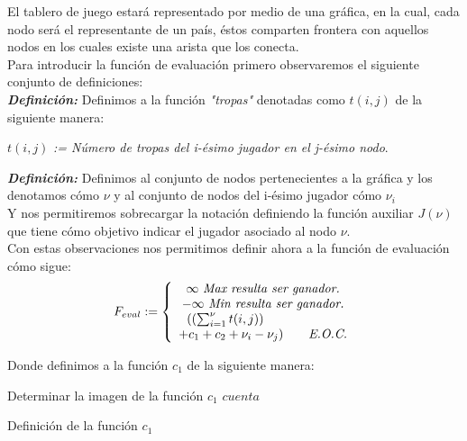 \documentclass[12pt,twocolumn,draft]{article}
\begin{document}
El tablero de juego estar\'a representado por medio de una gr\'afica, en la cual, cada nodo  ser\'a el representante de un pa\'is, \'estos comparten frontera con aquellos nodos en los cuales existe una arista que los conecta.\\

Para introducir la funci\'on de evaluaci\'on primero observaremos el siguiente conjunto de definiciones:\\

\textbf{\textit{Definici\'on:}}
Definimos a la funci\'on  \textit{"tropas"} denotadas como 
$t(i,j)$ de la siguiente manera:
\begin{center}
$t(i,j)$ \textit{:= N\'umero de tropas del i-\'esimo  jugador en el j-\'esimo nodo}.\\
\end{center}

\textbf{\textit{Definici\'on:}}
Definimos al conjunto de nodos pertenecientes a la gr\'afica y los denotamos c\'omo $\nu$ y al conjunto de nodos del i-\'esimo jugador c\'omo $\nu_{i}$\\

Y nos permitiremos sobrecargar la notaci\'on definiendo la funci\'on auxiliar $J(\nu)$ que tiene c\'omo objetivo indicar el jugador asociado al nodo $\nu$.\\


Con estas observaciones nos permitimos definir ahora a la funci\'on de evaluaci\'on c\'omo sigue:\\

$$ 
F_{eval}:= \left\{\begin{array}{c l}
  \infty\ \textit{Max\ resulta\ ser\ ganador.}\\
  -\infty\ \textit{Min\ resulta\ ser\ ganador.}\\
  ((\sum_{i=1}^{\nu} t(i,j)) \qquad \qquad \qquad\\
  +c_{1}+c_{2}+\nu_{i}-\nu_{j}) \qquad \textit{E.O.C.}
\end{array}
\right.
$$

Donde definimos a la funci\'on $c_{1}$ de la siguiente manera:

\begin{algorithm}
\begin{algorithmic}[1]
\ENSURE Determinar la imagen de la funci\'on $c_{1}$
\ENDIF
\ENDFOR
{}
\ELSE
{}
\ENDIF
\ENDFOR
\RETURN $cuenta$

\end{algorithmic}
\caption{Definici\'on de la funci\'on $c_{1}$}
\label{c1}
\end{algorithm}
\end{document}
